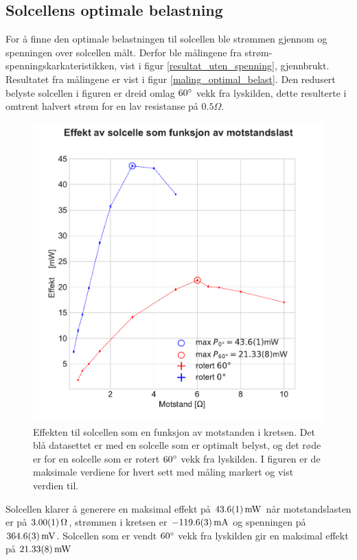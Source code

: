 \documentclass[%
 reprint,
 amsmath,amssymb,
 aps,
 norsk,
 booktabs
]{revtex4-1}
\begin{document}
\subsection{Solcellens optimale belastning}
For å finne den optimale belastningen til solcellen ble strømmen gjennom og spenningen over solcellen målt. Derfor ble målingene fra strøm-spenningskarkateristikken, vist i figur \vref{resultat_uten_spenning}, gjennbrukt. Resultatet fra målingene er vist i figur \vref{maling_optimal_belast}. Den redusert belyste solcellen i figuren er dreid omlag $60\degree$ vekk fra lyskilden, dette resulterte i omtrent halvert strøm for en lav resistanse på $0.5\Omega$.
\begin{figure}
  \centering
  \includegraphics[scale=0.47]{effekt.pdf}
  \caption{Effekten til solcellen som en funksjon av motstanden i kretsen. Det blå datasettet er med en solcelle som er optimalt belyst, og det røde er for en solcelle som er rotert $60\degree$ vekk fra lyskilden. I figuren er de maksimale verdiene for hvert sett med måling markert og vist verdien til.}
  \label{maling_optimal_belast}
\end{figure}
Solcellen klarer å generere en maksimal effekt på $\SI{43.6\pm0.1}{\milli\watt}$ når motstandslasten er på $\SI{3.00\pm0.01}{\Omega}$, strømmen i kretsen er $-\SI{119.6\pm0.3}{\milli\ampere}$ og spenningen på $\SI{364.6\pm0.3}{\milli\volt}$. Solcellen som er vendt $60\degree$ vekk fra lyskilden gir en maksimal effekt på $\SI{21.33\pm0.08}{\milli\watt}$
\end{document}
